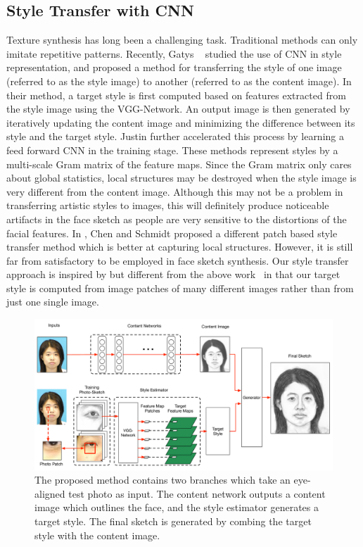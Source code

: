 \documentclass[10pt,twocolumn,letterpaper]{article}
\begin{document}
\subsection{Style Transfer with CNN}
Texture synthesis has long been a challenging task. Traditional methods can only imitate repetitive patterns. Recently, Gatys \etal ~\cite{gatys2015texture,gatys2015neural} studied the use of CNN in style representation, and proposed a method for transferring the style of one image (referred to as the style image) to another (referred to as the content image). In their method, a target style is first computed based on features extracted from the style image using the VGG-Network. An output image is then generated by iteratively updating the content image and minimizing the difference between its style and the target style. Justin \etal \cite{feifei2016} further accelerated this process by learning a feed forward CNN in the training stage. These methods represent styles by a multi-scale Gram matrix of the feature maps. Since the Gram matrix only cares about global statistics, local structures may be destroyed when the style image is very different from the content image. Although this may not be a problem in transferring artistic styles to images, this will definitely produce noticeable artifacts in the face sketch as people are very sensitive to the distortions of the facial features. In \cite{Chen2016Patch}, Chen and Schmidt proposed a different patch based style transfer method which is better at capturing local structures. However, it is still far from satisfactory to be employed in face sketch synthesis. Our style transfer approach is inspired by but different from the above work~\cite{gatys2015texture,gatys2015neural,feifei2016} in that our target style is computed from image patches of many different images rather than from just one single image. 
\begin{figure}[t]
\centering
\includegraphics[width=0.85\linewidth]{img/overview.pdf}
\caption{The proposed method contains two branches which take an eye-aligned test photo as input. The content network outputs a content image which outlines the face, and the style estimator generates a target style. The final sketch is generated by combing the target style with the content image.}
\label{fig:overview}
\end{figure}
\end{document}
